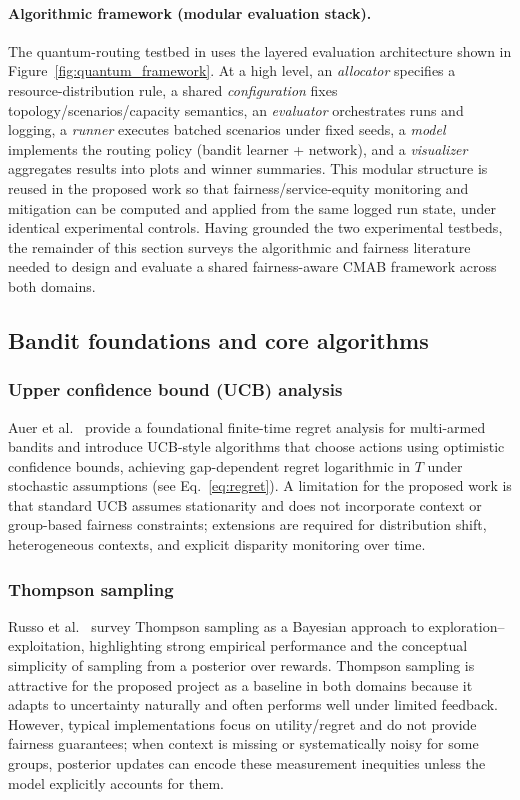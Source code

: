 \documentclass[conference]{IEEEtran}
\begin{document}
\paragraph{Algorithmic framework (modular evaluation stack).}
The quantum-routing testbed in \cite{garcia2026threat_aware_quantum_routing} uses the layered
evaluation architecture shown in Figure~\ref{fig:quantum_framework}. At a high level, an
\emph{allocator} specifies a resource-distribution rule, a shared \emph{configuration} fixes
topology/scenarios/capacity semantics, an \emph{evaluator} orchestrates runs and logging, a
\emph{runner} executes batched scenarios under fixed seeds, a \emph{model} implements the
routing policy (bandit learner + network), and a \emph{visualizer} aggregates results into
plots and winner summaries. This modular structure is reused in the proposed work so that
fairness/service-equity monitoring and mitigation can be computed and applied from the same
logged run state, under identical experimental controls.
Having grounded the two experimental testbeds, the remainder of this section surveys the
algorithmic and fairness literature needed to design and evaluate a shared fairness-aware CMAB
framework across both domains.


\subsection{Bandit foundations and core algorithms}

\subsubsection{Upper confidence bound (UCB) analysis}
Auer et al.~\cite{auer2002finite} provide a foundational finite-time regret analysis for
multi-armed bandits and introduce UCB-style algorithms that choose actions using optimistic
confidence bounds, achieving gap-dependent regret logarithmic in $T$ under stochastic
assumptions (see Eq.~\ref{eq:regret}). A limitation for the proposed work is that standard
UCB assumes stationarity and does not incorporate context or group-based fairness constraints;
extensions are required for distribution shift, heterogeneous contexts, and explicit disparity
monitoring over time.

\subsubsection{Thompson sampling}
Russo et al.~\cite{russo2018tutorial} survey Thompson sampling as a Bayesian approach to
exploration--exploitation, highlighting strong empirical performance and the conceptual
simplicity of sampling from a posterior over rewards. Thompson sampling is attractive for the
proposed project as a baseline in both domains because it adapts to uncertainty naturally and
often performs well under limited feedback. However, typical implementations focus on
utility/regret and do not provide fairness guarantees; when context is missing or
systematically noisy for some groups, posterior updates can encode these measurement
inequities unless the model explicitly accounts for them.
\end{document}
